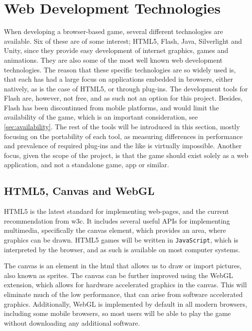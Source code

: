 \section{Web Development Technologies}
\label{sec:tools}
When developing a browser-based game, several different technologies are available.
Six of these are of some interest; HTML5, Flash, Java, Silverlight and Unity, since they provide easy development of internet graphics, games and animations.
They are also some of the most well known web development technologies.
The reason that these specific technologies are so widely used is, that each has had a large focus on applications embedded in browsers, either natively, as is the case of HTML5, or through plug-ins.
The development tools for Flash are, however, not free, and as such not an option for this project.\cite{adobe13}
Besides, Flash has been discontinued from mobile platforms,\cite{adobe12} and would limit the availability of the game, which is an important consideration, see \autoref{sec:availability}.
The rest of the tools will be introduced in this section, mostly focusing on the portability of each tool, as measuring differences in performance and prevalence of required plug-ins and the like is virtually impossible.
Another focus, given the scope of the project, is that the game should exist solely as a web application, and not a standalone game, app or similar.

\subsection{HTML5, Canvas and WebGL}
HTML5 is the latest standard for implementing web-pages, and the current recommendation from \ac{w3c}.\cite{html513}
It includes several useful APIs for implementing multimedia, specifically the canvas element, which provides an area, where graphics can be drawn.
HTML5 games will be written in \texttt{JavaScript}, which is interpreted by the browser, and as such is available on most computer systems.\newline

The canvas is an element in the html that allows us to draw or import pictures, also known as sprites.
The canvas can be further improved using the WebGL extension, which allows for hardware accelerated graphics in the canvas.\cite{khronos13}
This will eliminate much of the low performance, that can arise from software accelerated graphics.
Additionally, WebGL is implemented by default in all modern browsers, including some mobile browsers, so most users will be able to play the game without downloading any additional software.

